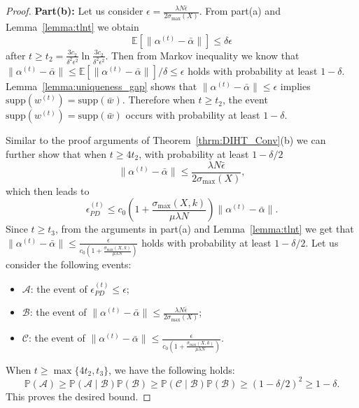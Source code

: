 \documentclass[11pt]{article}
\newcommand{\supp}{\text{supp}}
\numberwithin{equation}{section}
\numberwithin{table}{section}
\numberwithin{figure}{section}
\begin{document}
\begin{proof}
\noindent\textbf{Part(b):} Let us consider $\epsilon = \frac{\lambda N \bar\epsilon}{2\sigma_{\max}(X)}$. From part(a) and Lemma~\ref{lemma:tlnt} we obtain
\[
\mathbb{E} [\|\alpha^{(t)} - \bar \alpha\|] \le \delta\epsilon
\]
after $t \ge t_2 = \frac{3c_2}{\delta^2\epsilon^2}\ln \frac{3c_2}{\delta^2\epsilon^2}$. Then from Markov inequality we know that $\|\alpha^{(t)} - \bar \alpha\|\le \mathbb{E} [\|\alpha^{(t)} - \bar \alpha\|]/\delta \le \epsilon$ holds with probability at least $1-\delta$. Lemma~\ref{lemma:uniqueness_gap} shows that $\|\alpha^{(t)} - \bar \alpha\|\le \epsilon$ implies $\supp(w^{(t)}) = \supp(\bar w)$. Therefore when $t \ge t_2$, the event $\supp(w^{(t)}) = \supp(\bar w)$ occurs with probability at least $1-\delta$.

Similar to the proof arguments of Theorem~\ref{thrm:DIHT_Conv}(b) we can further show that when $t \ge 4 t_2$, with probability at least $1-\delta/2$
\[
\|\alpha^{(t)} - \bar\alpha\| \le \frac{\lambda N \bar\epsilon}{2\sigma_{\max}(X)},
\]
which then leads to
\[
\epsilon_{PD}^{(t)} \le c_0 \left( 1 + \frac{\sigma_{\max}(X,k)}{\mu\lambda N} \right) \|\alpha^{(t)} - \bar\alpha\|.
\]
Since $t\ge t_3$, from the arguments in part(a) and Lemma~\ref{lemma:tlnt} we get that $\|\alpha^{(t)} - \bar \alpha\| \le \frac{\epsilon}{c_0\left( 1 + \frac{\sigma_{\max}(X,k)}{\mu\lambda N} \right)}$ holds with probability at least $1-\delta/2$. Let us consider the following events:
\begin{itemize}
  \item $\mathcal{A}$: the event of $\epsilon_{PD}^{(t)} \le \epsilon$;
  \item $\mathcal{B}$: the event of $\|\alpha^{(t)} - \bar\alpha\|\le \frac{\lambda N \bar\epsilon}{2\sigma_{\max}(X)}$;
  \item $\mathcal{C}$: the event of $\|\alpha^{(t)} - \bar \alpha\| \le \frac{\epsilon}{c_0\left( 1 + \frac{\sigma_{\max}(X,k)}{\mu\lambda N} \right)}$.
\end{itemize}
When $t\ge \max\{4t_2, t_3\}$, we have the following holds:
\[
\mathbb{P} (\mathcal{A}) \ge \mathbb{P} (\mathcal{A}\mid \mathcal{B}) \mathbb{P} (\mathcal{B})\ge \mathbb{P} (\mathcal{C}\mid \mathcal{B})\mathbb{P}(\mathcal{B}) \ge (1-\delta/2)^2 \ge 1-\delta.
\]
This proves the desired bound.
\end{proof}
\end{document}
